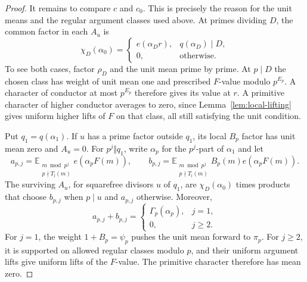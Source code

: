 \begin{proof}
It remains to compare $c$ and $c_0$.  This is precisely the reason for
the unit means and the regular argument classes used above.  At primes
dividing $D$, the common factor in each $A_u$ is
\begin{equation}\label{eq:kernel-D-factor}
 \chi_D(\alpha_0)=
 \begin{cases}
 e(\alpha_Dr),&q(\alpha_D)\mid D,\\
 0,&\text{otherwise}.
 \end{cases}
\end{equation}
To see both cases, factor $\rho_D$ and the unit mean prime by prime.
At $p\mid D$ the chosen class has weight of unit mean one and prescribed
$F$-value modulo $p^{E_p}$.  A character of conductor at most $p^{E_p}$
therefore gives its value at $r$.  A primitive character of higher
conductor averages to zero, since Lemma~\ref{lem:local-lifting} gives
uniform higher lifts of $F$ on that class, all still satisfying the unit
condition.

Put $q_1=q(\alpha_1)$.  If $u$ has a prime factor outside $q_1$, its
local $B_p$ factor has unit mean zero and $A_u=0$.
For $p^j\Vert q_1$, write $\alpha_p$ for the $p^j$-part of $\alpha_1$
and let
\[
 a_{p,j}=\mathbb E_{\substack{m\bmod p^j\\p\nmid T_l(m)}}
                  e(\alpha_pF(m)),\qquad
 b_{p,j}=\mathbb E_{\substack{m\bmod p^j\\p\nmid T_l(m)}}
                  B_p(m)e(\alpha_pF(m)).
\]
The surviving $A_u$, for squarefree divisors $u$ of $q_1$, are
$\chi_D(\alpha_0)$ times products that choose $b_{p,j}$ when $p\mid u$
and $a_{p,j}$ otherwise.  Moreover,
\begin{equation}\label{eq:kernel-local-realization}
 a_{p,j}+b_{p,j}=
 \begin{cases}
 \Gamma_p(\alpha_p),&j=1,\\
 0,&j\ge2.
 \end{cases}
\end{equation}
For $j=1$, the weight $1+B_p=\psi_p$ pushes the unit mean forward to
$\pi_p$.  For $j\ge2$, it is supported on allowed regular classes
modulo $p$, and their uniform argument lifts give uniform lifts of the
$F$-value.  The primitive character therefore has mean zero.


\end{proof}
